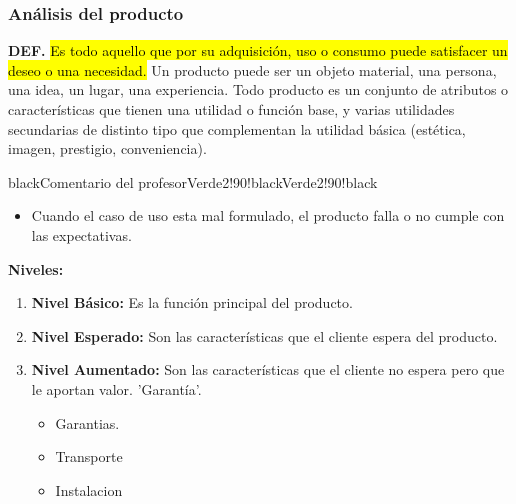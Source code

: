 \documentclass{templateNote}
\newcommand{\hlcolor}[2]{{\sethlcolor{#1}\hl{#2}}}
\begin{document}
\newpage
\subsubsection{Análisis del producto}
\textbf{DEF.} \hlcolor{Amarillo!50}{Es todo aquello que por su adquisición, uso o consumo puede satisfacer un deseo o una necesidad.} Un producto puede ser un objeto material, una persona, una idea, un lugar, una experiencia. \newline
Todo producto es un conjunto de atributos o características que tienen una utilidad o función base, y varias utilidades secundarias de distinto tipo que complementan la utilidad básica (estética, imagen, prestigio, conveniencia).
\begin{CuadroPersonalizado}{black}{Comentario del profesor}{Verde2!90!black}{Verde2!90!black}
  \begin{itemize}
    \item Cuando el caso de uso esta mal formulado, el producto falla o no cumple con las expectativas.
  \end{itemize}
\end{CuadroPersonalizado}
\textbf{Niveles:}
\begin{enumerate}
  \item \textbf{Nivel Básico:} Es la función principal del producto.
  \item \textbf{Nivel Esperado:} Son las características que el cliente espera del producto.
  \item \textbf{Nivel Aumentado:} Son las características que el cliente no espera pero que le aportan valor. 'Garantía'.
  \begin{itemize}
    \item Garantias.
    \item Transporte
    \item Instalacion
  \end{itemize}
\end{enumerate}
\end{document}
